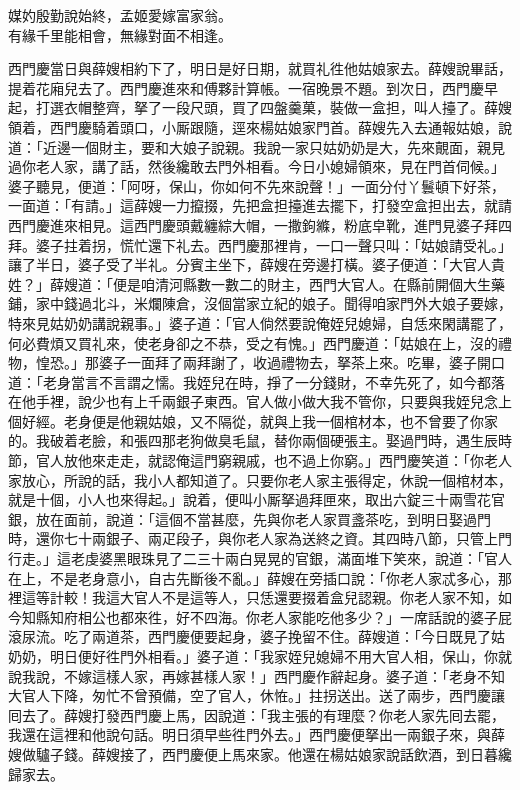 \begin{myquote} 
媒妁殷勤說始終，孟姬愛嫁富家翁。\\有緣千里能相會，無緣對面不相逢。
\end{myquote} 

西門慶當日與薛嫂相約下了，明日是好日期，就買礼徃他姑娘家去。薛嫂說畢話，提着花廂兒去了。西門慶進來和傅夥計算帳。一宿晚景不題。到次日，西門慶早起，打選衣帽整齊，拏了一段尺頭，買了四盤羹菓，裝做一盒担，叫人擡了。薛嫂領着，西門慶騎着頭口，小厮跟隨，逕來楊姑娘家門首。薛嫂先入去通報姑娘，說道：「近邊一個財主，{}要和大娘子說親。我說一家只姑奶奶是大，先來覿面，親見過你老人家，講了話，{}然後纔敢去門外相看。今日小媳婦領來，見在門首伺候。」婆子聽見，便道：「阿呀，{}保山，你如何不先來說聲！」一面分付丫鬟頓下好茶，一面道：「有請。」這薛嫂一力攛掇，先把盒担擡進去擺下，打發空盒担出去，就請西門慶進來相見。這西門慶頭戴纏綜大帽，一撒鉤縧，粉底皁靴，進門見婆子拜四拜。婆子拄着拐，慌忙還下礼去。西門慶那裡肯，一口一聲只叫：「姑娘請受礼。」讓了半日，婆子受了半礼。分賓主坐下，薛嫂在旁邊打橫。婆子便道：「大官人貴姓？」薛嫂道：「便是咱清河縣數一數二的財主，西門大官人。在縣前開個大生藥鋪，家中錢過北斗，米爛陳倉，沒個當家立紀的娘子。聞得咱家門外大娘子要嫁，特來見姑奶奶講說親事。」婆子道：「官人倘然要說俺姪兒媳婦，自恁來閑講罷了，何必費煩又買礼來，使老身卻之不恭，受之有愧。」西門慶道：「姑娘在上，沒的禮物，惶恐。」那婆子一面拜了兩拜謝了，收過禮物去，拏茶上來。吃畢，婆子開口道：「老身當言不言謂之懦。{}我姪兒在時，掙了一分錢財，不幸先死了，如今都落在他手裡，說少也有上千兩銀子東西。官人做小做大我不管你，只要與我姪兒念上個好經。老身便是他親姑娘，又不隔從，就與上我一個棺材本，也不曾要了你家的。我破着老臉，和張四那老狗做臭毛鼠，替你兩個硬張主。娶過門時，遇生辰時節，官人放他來走走，就認俺這門窮親戚，也不過上你窮。」{}西門慶笑道：「你老人家放心，所說的話，我小人都知道了。只要你老人家主張得定，休說一個棺材本，就是十個，小人也來得起。」說着，便叫小厮拏過拜匣來，取出六錠三十兩雪花官銀，放在面前，說道：「這個不當甚麼，先與你老人家買盞茶吃，到明日娶過門時，還你七十兩銀子、兩疋段子，與你老人家為送終之資。其四時八節，只管上門行走。」這老虔婆黑眼珠見了二三十兩白晃晃的官銀，滿面堆下笑來，說道：「官人在上，不是老身意小，自古先斷後不亂。」薛嫂在旁插口說：「你老人家忒多心，那裡這等計較！我這大官人不是這等人，只恁還要掇着盒兒認親。你老人家不知，如今知縣知府相公也都來徃，好不四海。你老人家能吃他多少？」一席話說的婆子屁滾尿流。吃了兩道茶，西門慶便要起身，婆子挽留不住。薛嫂道：「今日既見了姑奶奶，明日便好徃門外相看。」婆子道：「我家姪兒媳婦不用大官人相，保山，你就說我說，不嫁這樣人家，再嫁甚樣人家！」西門慶作辭起身。婆子道：「老身不知大官人下降，匆忙不曾預備，空了官人，休恠。」拄拐送出。送了兩步，西門慶讓囘去了。薛嫂打發西門慶上馬，因說道：「我主張的有理麼？你老人家先囘去罷，我還在這裡和他說句話。明日須早些徃門外去。」西門慶便拏出一兩銀子來，與薛嫂做驢子錢。薛嫂接了，西門慶便上馬來家。他還在楊姑娘家說話飲酒，到日暮纔歸家去。

